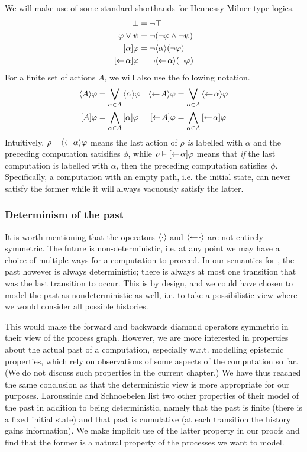 We will make use of some standard shorthands for Hennessy-Milner type logics.
\begin{align*}
    \bot &= \neg\top \\
    \varphi \lor \psi &= \neg(\neg\varphi \land \neg\psi) \\
    \mbox{\ensuremath{[\alpha]}}\varphi &= \neg\mbox{\ensuremath{\langle \alpha \rangle}}(\neg\varphi) \\
    \mbox{\ensuremath{[\leftarrow\! \alpha]}}\varphi &= \neg\mbox{\ensuremath{\langle\leftarrow\! \alpha \rangle}}(\neg\varphi) \\
\end{align*}
For a finite set of actions $A$, we will also use the following notation.
\begin{align*}
    \mbox{\ensuremath{\langle A \rangle}}\varphi &= \bigvee_{\alpha\in A} \mbox{\ensuremath{\langle \alpha \rangle}} \varphi  &
    \mbox{\ensuremath{\langle\leftarrow\! A \rangle}}\varphi &= \bigvee_{\alpha\in A} \mbox{\ensuremath{\langle\leftarrow\! \alpha \rangle}} \varphi \\
    \mbox{\ensuremath{[A]}}\varphi &= \bigwedge_{\alpha\in A} \mbox{\ensuremath{[\alpha]}} \varphi  &
    \mbox{\ensuremath{[\leftarrow\! A]}}\varphi &= \bigwedge_{\alpha\in A} \mbox{\ensuremath{[\leftarrow\! \alpha]}} \varphi \\
\end{align*}
Intuitively, $\rho\vDash\mbox{\ensuremath{\langle\leftarrow\! \alpha \rangle}}\varphi$ means the last action of $\rho$
{\em is} labelled with $\alpha$ and the preceding computation satisifies $\phi$, while
$\rho\vDash\mbox{\ensuremath{[\leftarrow\! \alpha]}}\varphi$ means that {\em if} the last computation is labelled
with $\alpha$, then the preceding computation satisfies $\phi$. Specifically, a
computation with an empty path, i.e. the initial state, can never satisfy the former
while it will always vacuously satisfy the latter.

\subsubsection{Determinism of the past}
\label{sec:determinism_of_the_past}

It is worth mentioning that the operators $\mbox{\ensuremath{\langle \cdot \rangle}}$ and $\mbox{\ensuremath{\langle\leftarrow\! \cdot \rangle}}$ are
not entirely symmetric. The future is non-deterministic, i.e. at any point we may
have a choice of multiple ways for a computation to proceed. 
In our semantics for \HMLpast{}, the past however is
always deterministic; there is always at most one transition that was the last
transition to occur. This is by design, and we could have chosen to model the past
as nondeterministic as well, i.e. to take a possibilistic view where we would consider
all possible histories. 

This would make the forward and backwards diamond
operators symmetric in their view of the process graph. However, we are more
interested in properties about the actual past of a computation, especially
w.r.t. modelling epistemic properties, which rely on observations of some aspects
of the computation so far. (We do not discuss such properties in the
current chapter.) We have thus reached the same conclusion as \cite{Laroussinie00}
that the deterministic view is more appropriate for our purposes.
Laroussinie and Schnoebelen list two other
properties of their model of the past in addition to being deterministic, namely that
the past is finite (there is a fixed initial state) and that past is cumulative (at each
transition the history gains information). We make implicit use of the latter property 
in our proofs and find that the former is a natural property of the processes we
want to model.

